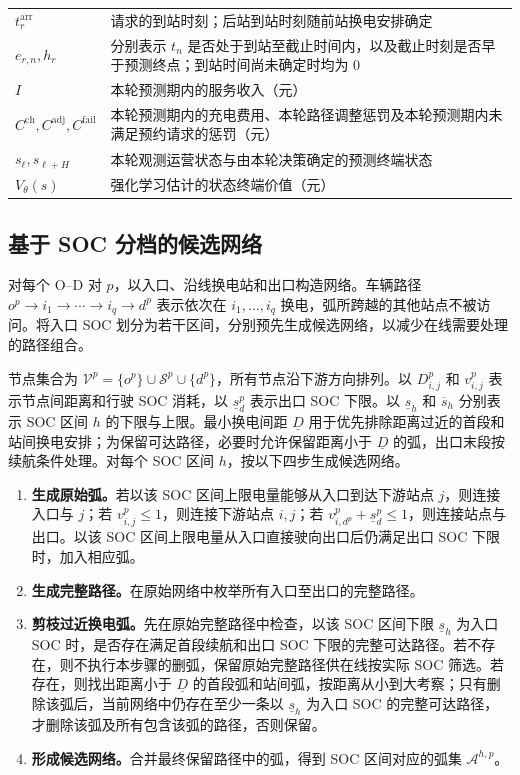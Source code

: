 \begin{longtable}{@{}p{4.4cm}p{11.1cm}@{}}
$t_r^{\mathrm{arr}}$ & 请求的到站时刻；后站到站时刻随前站换电安排确定 \\
$e_{r,n},h_r$ & 分别表示 $t_n$ 是否处于到站至截止时间内，以及截止时刻是否早于预测终点；到站时间尚未确定时均为 $0$ \\
$I$ & 本轮预测期内的服务收入（元） \\
$C^{\mathrm{ch}},C^{\mathrm{adj}},C^{\mathrm{fail}}$ & 本轮预测期内的充电费用、本轮路径调整惩罚及本轮预测期内未满足预约请求的惩罚（元） \\
$s_\ell,s_{\ell+H}$ & 本轮观测运营状态与由本轮决策确定的预测终端状态 \\
$V_\theta(s)$ & 强化学习估计的状态终端价值（元） \\
\end{longtable}

\subsection{基于 SOC 分档的候选网络}
\label{sec:network}
对每个 O--D 对 $p$，以入口、沿线换电站和出口构造网络。车辆路径
$o^p\to i_1\to\cdots\to i_q\to d^p$
表示依次在 $i_1,\ldots,i_q$ 换电，弧所跨越的其他站点不被访问。将入口 SOC 划分为若干区间，分别预先生成候选网络，以减少在线需要处理的路径组合。

节点集合为 $\mathcal V^p=\{o^p\}\cup\mathcal S^p\cup\{d^p\}$，所有节点沿下游方向排列。以 $D_{i,j}^p$ 和 $v_{i,j}^p$ 表示节点间距离和行驶 SOC 消耗，以 $\underline s_d^p$ 表示出口 SOC 下限。以 $\underline s_h$ 和 $\overline s_h$ 分别表示 SOC 区间 $h$ 的下限与上限。最小换电间距 $\underline D$ 用于优先排除距离过近的首段和站间换电安排；为保留可达路径，必要时允许保留距离小于 $\underline D$ 的弧，出口末段按续航条件处理。对每个 SOC 区间 $h$，按以下四步生成候选网络。
\begin{enumerate}[label=\textbf{步骤\arabic*.},leftmargin=4.2em]
\item \textbf{生成原始弧。}若以该 SOC 区间上限电量能够从入口到达下游站点 $j$，则连接入口与 $j$；若 $v_{i,j}^p\le1$，则连接下游站点 $i,j$；若 $v_{i,d^p}^p+\underline s_d^p\le1$，则连接站点与出口。以该 SOC 区间上限电量从入口直接驶向出口后仍满足出口 SOC 下限时，加入相应弧。
\item \textbf{生成完整路径。}在原始网络中枚举所有入口至出口的完整路径。
\item \textbf{剪枝过近换电弧。}先在原始完整路径中检查，以该 SOC 区间下限 $\underline s_h$ 为入口 SOC 时，是否存在满足首段续航和出口 SOC 下限的完整可达路径。若不存在，则不执行本步骤的删弧，保留原始完整路径供在线按实际 SOC 筛选。若存在，则找出距离小于 $\underline D$ 的首段弧和站间弧，按距离从小到大考察；只有删除该弧后，当前网络中仍存在至少一条以 $\underline s_h$ 为入口 SOC 的完整可达路径，才删除该弧及所有包含该弧的路径，否则保留。
\item \textbf{形成候选网络。}合并最终保留路径中的弧，得到 SOC 区间对应的弧集 $\mathcal A^{h,p}$。
\end{enumerate}

